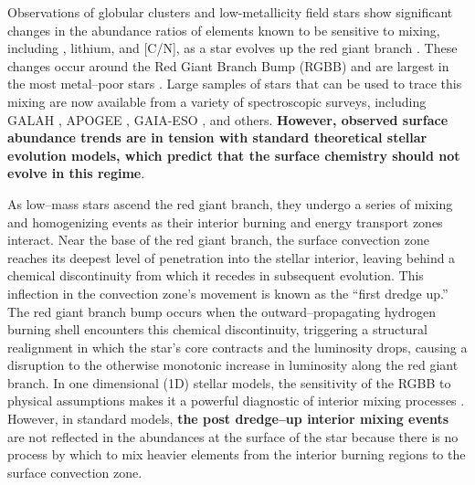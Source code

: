 
Observations of globular clusters and low-metallicity field stars show significant changes in the abundance ratios of elements known to be sensitive to mixing, including \ctwelvecthirteen, lithium, and [C/N], as a star evolves up the red giant branch \citep{Carbon1982, Pilachowski1986, Kraft1994, Shetrone2019}. These changes occur around the Red Giant Branch Bump (RGBB) and are largest in the most metal--poor stars \citep[e.g.][]{Gratton2000}. Large samples of stars that can be used to trace this mixing are now available from a variety of spectroscopic surveys, including GALAH \citep{buder2019}, APOGEE \citep{DR17}, GAIA-ESO \citep{Magrini2021b}, and others. \textbf{However, observed surface abundance trends are in tension with standard theoretical stellar evolution models, which predict that the surface chemistry should not evolve in this regime}.


As low--mass stars ascend the red giant branch, they undergo a series of mixing and homogenizing events as their interior burning and energy transport zones interact. Near the base of the red giant branch, the surface convection zone reaches its deepest level of penetration into the stellar interior, leaving behind a chemical discontinuity from which it recedes in subsequent evolution. This inflection in the convection zone's movement is known as the ``first dredge up.'' The red giant branch bump occurs when the outward--propagating hydrogen burning shell encounters this chemical discontinuity, triggering a structural realignment in which the star's core contracts and the luminosity drops, causing a disruption to the otherwise monotonic increase in luminosity along the red giant branch. In one dimensional (1D) stellar models, the sensitivity of the RGBB to physical assumptions makes it a powerful diagnostic of interior mixing processes \citep[e.g.][]{Christensen-Dalsgaard:2015, Joyce2015, Khan2018}. 
%
However, in standard models, \textbf{the post dredge--up 
interior mixing events} are not reflected in the abundances at the surface of the star because there is no process by which to mix heavier elements from the interior burning regions to the surface convection zone. 


